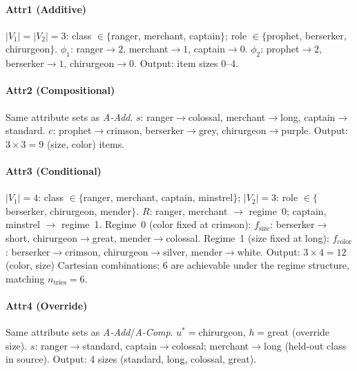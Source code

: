\documentclass[11pt]{article}
\begin{document}
\begin{sloppypar}
\paragraph{Attr1 (Additive)}
$|V_1|{=}|V_2|{=}3$: class $\in \{$ranger, merchant, captain$\}$; role $\in \{$prophet, berserker, chirurgeon$\}$.
$\phi_1$: ranger$\to 2$, merchant$\to 1$, captain$\to 0$.
$\phi_2$: prophet$\to 2$, berserker$\to 1$, chirurgeon$\to 0$.
Output: item sizes 0--4.

\paragraph{Attr2 (Compositional)}
Same attribute sets as \textit{A-Add}.
$s$: ranger$\to$colossal, merchant$\to$long, captain$\to$standard.
$c$: prophet$\to$crimson, berserker$\to$grey, chirurgeon$\to$purple.
Output: $3{\times}3{=}9$ (size, color) items.

\paragraph{Attr3 (Conditional)}
$|V_1|{=}4$: class $\in \{$ranger, merchant, captain, minstrel$\}$;
$|V_2|{=}3$: role $\in \{$berserker, chirurgeon, mender$\}$.
$R$: ranger, merchant $\to$ regime~0; captain, minstrel $\to$ regime~1.
Regime~0 (color fixed at crimson): $f_\text{size}$: berserker$\to$short, chirurgeon$\to$great, mender$\to$colossal.
Regime~1 (size fixed at long): $f_\text{color}$: berserker$\to$crimson, chirurgeon$\to$silver, mender$\to$white.
Output: $3{\times}4{=}12$ (color, size) Cartesian combinations; 6 are achievable under the regime structure, matching $n_\text{tries}{=}6$.

\paragraph{Attr4 (Override)}
Same attribute sets as \textit{A-Add}/\textit{A-Comp}.
$u^*{=}$chirurgeon, $h{=}$great (override size).
$s$: ranger$\to$standard, captain$\to$colossal; merchant$\to$long (held-out class in source).
Output: 4 sizes (standard, long, colossal, great).
\end{sloppypar}
\end{document}
